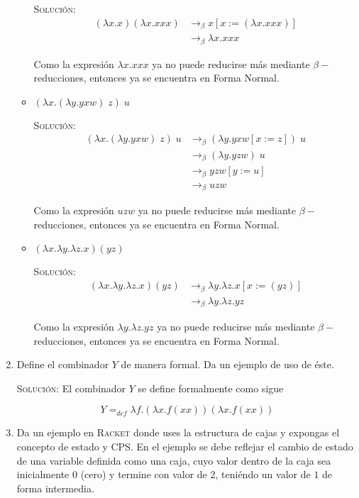 \documentclass[letterpaper,11pt]{article}
\begin{document}
\begin{enumerate}
\begin{itemize}
        \textsc{Solución:}
        \begin{align*}
            (\lambda x.x)(\lambda x.xxx) 
            &\rightarrow_{\beta} x [x := (\lambda x.xxx)] \\ 
            &\rightarrow_{\beta} \lambda x.xxx
        \end{align*}

        Como la expresión $\lambda x.xxx$ ya no puede reducirse más mediante 
        $\beta -$reducciones, entonces ya se encuentra en Forma Normal.

        \item $(\lambda x.(\lambda y.yxw) \; z) \; u$
        
        \textsc{Solución:}
        \begin{align*}
            (\lambda x.(\lambda y.yxw) \; z) \; u
            &\rightarrow_{\beta} (\lambda y.yxw[x := z]) \; u \\ 
            &\rightarrow_{\beta} (\lambda y.yzw) \; u \\ 
            &\rightarrow_{\beta} yzw[y := u] \\
            &\rightarrow_{\beta} uzw 
        \end{align*}

        Como la expresión $uzw$ ya no puede reducirse más mediante 
        $\beta -$reducciones, entonces ya se encuentra en Forma Normal.

        \item $(\lambda x.\lambda y.\lambda z.x) (yz)$
        
        \textsc{Solución:}
        \begin{align*}
            (\lambda x.\lambda y.\lambda z.x) (yz)
            &\rightarrow_{\beta} 
            \lambda y.\lambda z.x[x := (yz)] \\
            &\rightarrow_{\beta}
            \lambda y.\lambda z.yz
        \end{align*}

        Como la expresión $\lambda y.\lambda z.yz$ ya no puede reducirse más 
        mediante $\beta -$reducciones, entonces ya se encuentra en Forma Normal.
    \end{itemize}

    \item Define el combinador $Y$ de manera formal. Da un ejemplo de uso de 
    éste.

    \textsc{Solución:} El combinador $Y$ se define formalmente como sigue 

    \begin{equation*}
        Y =_{def} \lambda f.(\lambda x.f (xx)) (\lambda x.f (xx))
    \end{equation*}

    \item Da un ejemplo en \textsc{Racket} donde uses la estructura de cajas y
    expongas el concepto de estado y CPS. En el ejemplo se debe reflejar el 
    cambio de estado de una variable definida como una caja, cuyo valor dentro 
    de la caja sea inicialmente $0$ (cero) y termine con valor de $2$, teniéndo 
    un valor de $1$ de forma intermedia.
\end{enumerate}
\end{document}
